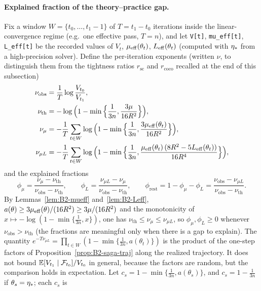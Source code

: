 \paragraph{Explained fraction of the theory--practice gap.}
Fix a window $W=\{t_0,\dots,t_1-1\}$ of $T=t_1-t_0$ iterations inside the linear-convergence regime (e.g.\ one
effective pass, $T=n$), and let \texttt{V[t]}, \texttt{mu\_eff[t]}, \texttt{L\_eff[t]} be the recorded values of
$V_t$, $\mu_{\mathrm{eff}}(\theta_t)$, $L_{\mathrm{eff}}(\theta_t)$ (computed with $\eta_\ast$ from a high-precision solver). Define the
per-iteration exponents (written $\nu$, to distinguish them from the tightness ratios $r_{\mathrm{sc}}$ and
$r_{\mathrm{coco}}$ recalled at the end of this subsection)
\begin{align}
\nu_{\mathrm{obs}}&=\frac1T\log\frac{V_{t_0}}{V_{t_1}}, \label{eq:B2-robs}\\
\nu_{\mathrm{th}}&=-\log\Big(1-\min\Big\{\frac1{3n},\frac{3\mu}{16R^2}\Big\}\Big), \label{eq:B2-rth}\\
\nu_{\mu}&=-\frac1T\sum_{t\in W}\log\Big(1-\min\Big\{\frac1{3n},\frac{3\mu_{\mathrm{eff}}(\theta_t)}{16R^2}\Big\}\Big), \label{eq:B2-rmu}\\
\nu_{\mu L}&=-\frac1T\sum_{t\in W}\log\Big(1-\min\Big\{\frac1{3n},\frac{\mu_{\mathrm{eff}}(\theta_t)\,(8R^2-5L_{\mathrm{eff}}(\theta_t))}{16R^4}\Big\}\Big), \label{eq:B2-rmuL}
\end{align}
and the explained fractions
\begin{equation}\label{eq:B2-explained}
\phi_\mu=\frac{\nu_\mu-\nu_{\mathrm{th}}}{\nu_{\mathrm{obs}}-\nu_{\mathrm{th}}},\qquad
\phi_L=\frac{\nu_{\mu L}-\nu_\mu}{\nu_{\mathrm{obs}}-\nu_{\mathrm{th}}},\qquad
\phi_{\mathrm{rest}}=1-\phi_\mu-\phi_L=\frac{\nu_{\mathrm{obs}}-\nu_{\mu L}}{\nu_{\mathrm{obs}}-\nu_{\mathrm{th}}} .
\end{equation}
By Lemmas~\ref{lem:B2-mueff} and~\ref{lem:B2-Leff}, $a(\theta)\ge3\mu_{\mathrm{eff}}(\theta)/(16R^2)\ge3\mu/(16R^2)$ and the monotonicity of
$x\mapsto-\log(1-\min\{\frac1{3n},x\})$, one has $\nu_{\mathrm{th}}\le \nu_\mu\le \nu_{\mu L}$, so
$\phi_\mu,\phi_L\ge0$ whenever $\nu_{\mathrm{obs}}>\nu_{\mathrm{th}}$ (the fractions are meaningful only when there is a gap
to explain). The quantity $e^{-T\nu_{\mu L}}=\prod_{t\in W}(1-\min\{\frac1{3n},a(\theta_t)\})$ is the product of the
one-step factors of Proposition~\ref{prop:B2-saga-traj} along the realized trajectory. It does not bound
$\mathbb{E}[V_{t_1}\mid\mathcal F_{t_0}]/V_{t_0}$ in general, because the factors are random, but the comparison holds in
expectation. Let $c_s=1-\min\{\frac1{3n},a(\theta_s)\}$, and $c_s=1-\frac1{3n}$ if $\theta_s=\eta_\ast$; each $c_s$ is
